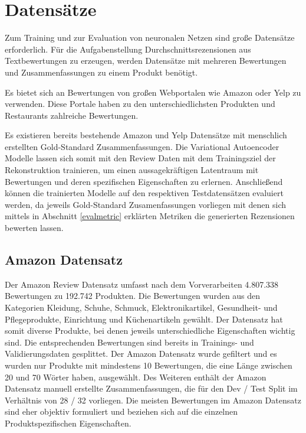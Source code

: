 \section{Datensätze}\raggedbottom

Zum Training und zur Evaluation von neuronalen Netzen sind große Datensätze erforderlich. 
Für die Aufgabenstellung Durchschnittsrezensionen aus Textbewertungen zu erzeugen, werden Datensätze mit mehreren Bewertungen und Zusammenfassungen zu einem Produkt benötigt.

Es bietet sich an Bewertungen von großen Webportalen wie Amazon oder Yelp zu verwenden. 
Diese Portale haben zu den unterschiedlichsten Produkten und Restaurants zahlreiche Bewertungen.

Es existieren bereits bestehende Amazon und Yelp Datensätze mit menschlich erstellten Gold-Standard Zusammenfassungen. 
Die Variational Autoencoder Modelle lassen sich somit mit den Review Daten mit dem Trainingsziel der Rekonstruktion trainieren, um einen aussagekräftigen Latentraum mit Bewertungen und deren spezifischen Eigenschaften zu erlernen.
Anschließend können die trainierten Modelle auf den respektiven Testdatensätzen evaluiert werden, da jeweils Gold-Standard Zusamenfassungen vorliegen mit denen sich mittels in Abschnitt \ref{evalmetric} erklärten Metriken die generierten Rezensionen bewerten lassen.

\subsection{Amazon Datensatz}
Der Amazon Review Datensatz \citep{brazinskas2020-unsupervised} umfasst nach dem Vorverarbeiten 4.807.338 Bewertungen zu 192.742 Produkten. 
Die Bewertungen wurden aus den Kategorien Kleidung, Schuhe, Schmuck, Elektronikartikel, Gesundheit- und Pflegeprodukte, Einrichtung und Küchenartikeln gewählt.
Der Datensatz hat somit diverse Produkte, bei denen jeweils unterschiedliche Eigenschaften wichtig sind.
Die entsprechenden Bewertungen sind bereits in Trainings- und Validierungsdaten gesplittet.
Der Amazon Datensatz wurde gefiltert und es wurden nur Produkte mit mindestens 10 Bewertungen, die eine Länge zwischen 20 und 70 Wörter haben, ausgewählt.
Des Weiteren enthält der Amazon Datensatz manuell erstellte Zusammenfassungen, die für den Dev / Test Split im Verhältnis von 28 / 32 vorliegen.
Die meisten Bewertungen im Amazon Datensatz sind eher objektiv formuliert und beziehen sich auf die einzelnen Produktspezifischen Eigenschaften.
